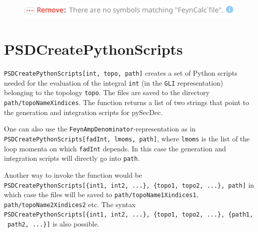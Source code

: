 \documentclass[../FeynHelpersManual.tex]{subfiles}
\begin{document}
\FloatBarrier
\begin{figure}[!ht]
\centering
\includegraphics[width=0.6\linewidth]{img/0uw74idqq2ilw.pdf}
\end{figure}
\FloatBarrier

\begin{Shaded}
\begin{Highlighting}[]
 
\end{Highlighting}
\end{Shaded}

\hypertarget{psdcreatepythonscripts}{
\section{PSDCreatePythonScripts}\label{psdcreatepythonscripts}}

\texttt{PSDCreatePythonScripts[\allowbreak{}int,\ \allowbreak{}topo,\ \allowbreak{}path]}
creates a set of Python scripts needed for the evaluation of the
integral \texttt{int} (in the \texttt{GLI} representation) belonging to
the topology \texttt{topo}. The files are saved to the directory
\texttt{path/topoNameXindices}. The function returns a list of two
strings that point to the generation and integration scripts for
pySecDec.

One can also use the \texttt{FeynAmpDenominator}-representation as in
\texttt{PSDCreatePythonScripts[\allowbreak{}fadInt,\ \allowbreak{}lmoms,\ \allowbreak{}path]},
where \texttt{lmoms} is the list of the loop momenta on which
\texttt{fadInt} depends. In this case the generation and integration
scripts will directly go into \texttt{path}.

Another way to invoke the function would be
\texttt{PSDCreatePythonScripts[\allowbreak{}\{\allowbreak{}int1,\ \allowbreak{}int2,\ \allowbreak{}...\},\ \allowbreak{}\{\allowbreak{}topo1,\ \allowbreak{}topo2,\ \allowbreak{}...\},\ \allowbreak{}path]}
in which case the files will be saved to
\texttt{path/topoName1Xindices1}, \texttt{path/topoName2Xindices2} etc.
The syntax
\texttt{PSDCreatePythonScripts[\allowbreak{}\{\allowbreak{}int1,\ \allowbreak{}int2,\ \allowbreak{}...\},\ \allowbreak{}\{\allowbreak{}topo1,\ \allowbreak{}topo2,\ \allowbreak{}...\},\ \allowbreak{}\{\allowbreak{}path1,\ \allowbreak{}path2,\ \allowbreak{}...\}]}
is also possible.
\end{document}
